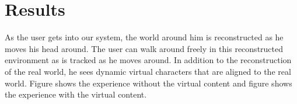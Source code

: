 \section{Results}
As the user gets into our system, the world around him is reconstructed as he moves his head around. The user can walk around freely in this reconstructed environment as is tracked as he moves around. In addition to the reconstruction of the real world, he sees dynamic virtual characters that are aligned to the real world. Figure  shows the experience without the virtual content and figure  shows the experience with the virtual content.


